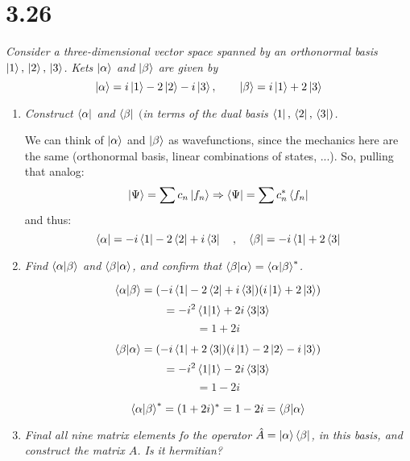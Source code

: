 \documentclass[12pt]{article}
\begin{document}
\section*{3.26}
\emph{Consider a three-dimensional vector space spanned by an orthonormal basis $\ket{1}, \,\ket{2},\,\ket{3}$. Kets $\ket{\alpha}$ and $\ket{\beta}$ are given by}
 \[\ket{\alpha} = i\ket{1} -2\ket{2}-i\ket{3}, \qquad \ket{\beta} = i\ket{1} + 2\ket{3}\]
\begin{enumerate}[label=\alph*)]
\item \emph{Construct $\bra{\alpha}$ and $\bra{\beta}$ $($in terms of the dual basis $\bra{1},\,\bra{2},\,\bra{3})$.}\bigskip

We can think of $\ket{\alpha}$ and $\ket{\beta}$ as wavefunctions, since the mechanics here are the same (orthonormal basis, linear combinations of states, ...). So, pulling that analog:
\[\ket{\Psi} = \sum c_n \ket{f_n} \Rightarrow \bra{\Psi} = \sum c^*_n \bra{f_n}\]
and thus:
\[\bra{\alpha} = -i \bra{1} -2\bra{2} +i\bra{3} \quad , \quad \bra{\beta} = -i\bra{1} +2\bra{3}\]

\item \emph{Find $\braket{\alpha}{\beta}$ and $\braket{\beta}{\alpha}$, and confirm that $\braket{\beta}{\alpha} = \braket{\alpha}{\beta}^*$.}\bigskip

\[\braket{\alpha}{\beta} = (-i\bra{1} -2\bra{2} +i\bra{3})(i\ket{1} +2\ket{3})\]
\[= -i^2 \braket{1}{1} +2i\braket{3}{3}\]
\[=1+2i\]

\[\braket{\beta}{\alpha} = (-i\bra{1} + 2\bra{3})(i\ket{1} -2\ket{2} -i\ket{3})\]
\[=-i^2\braket{1}{1} -2i\braket{3}{3}\]
\[=1-2i\]

\[\braket{\alpha}{\beta}^* = (1+2i)^* = 1-2i = \braket{\beta}{\alpha}\]

\item \emph{Final all nine matrix elements fo the operator $\hat{A} = \ket{\alpha}\bra{\beta}$, in this basis, and construct the matrix $A$. Is it hermitian?}\bigskip


\end{enumerate}
\end{document}
